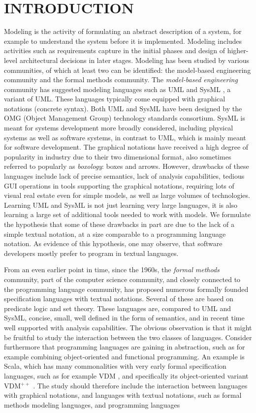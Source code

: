 \section{INTRODUCTION}
\label{sec:introduction}

Modeling is the activity of formulating an abstract description of a
system, for example to understand the system before it is implemented.
Modeling includes activities such as requirements capture in the
initial phases and design of higher-level architectural decisions in
later stages. Modeling has been studied by various communities, of
which at least two can be identified: the model-based engineering
community and the formal methods community. The {\em model-based
  engineering} community has suggested modeling languages such as UML
\cite{uml} and SysML \cite{sysml}, a variant of UML.  These languages
typically come equipped with graphical notations (concrete syntax).
Both UML and SysML have been designed by the OMG (Object Management
Group) technology standards consortium. SysML is meant for systems
development more broadly considered, including physical systems as
well as software systems, in contrast to UML, which is mainly meant
for software development. The graphical notations have received a high
degree of popularity in industry due to their two dimensional format,
also sometimes referred to popularly as {\em boxology}: boxes and
arrows. However, drawbacks of these languages include lack of precise
semantics, lack of analysis capabilities, tedious GUI operations in
tools supporting the graphical notations, requiring lots of visual
real estate even for simple models, as well as large volumes of
technologies. Learning UML and SysML is not just learning very large
languages, it is also learning a large set of additional tools needed
to work with models. We formulate the hypothesis that some of these
drawbacks in part are due to the lack of a simple textual notation, at
a size comparable to a programming language notation. As evidence of
this hypothesis, one may observe, that software developers mostly
prefer to program in textual languages.

From an even earlier point in time, since the 1960s, the {\em formal
  methods} community, part of the computer science community, and
closely connected to the programming language community, has proposed
numerous formally founded specification languages with textual
notations. Several of these are based on predicate logic and set
theory. These languages are, compared to UML and SysML, concise,
small, well defined in the form of semantics, and in recent time well
supported with analysis capabilities. The obvious observation is that
it might be fruitful to study the interaction between the two classes
of languages. Consider furthermore that programming languages are
gaining in abstraction, such as for example combining object-oriented
and functional programming. An example is Scala, which has many
commonalities with very early formal specification languages, such as
for example VDM \cite{vdm78}, and specifically its object-oriented
variant VDM$^{++}$ \cite{vdmplusplus05}.  The study should therefore
include the interaction between languages with graphical notations,
and languages with textual notations, such as formal methods modeling
languages, and programming languages

